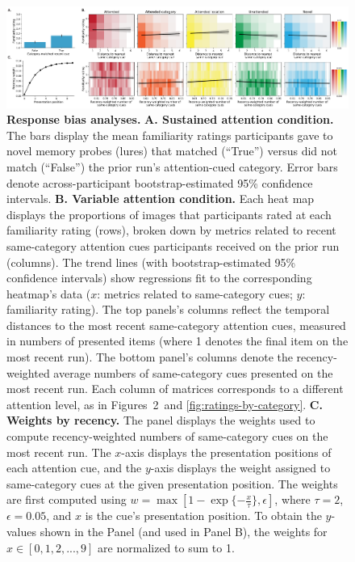 \documentclass{article}
\newcommand{\familiarity}{2}
\begin{document}
\begin{figure}[tp]
  \centering
  \includegraphics[width=1\textwidth]{figs/response_bias.pdf}

\caption{\textbf{Response bias analyses.} \textbf{A. Sustained attention
condition.} The bars display the mean familiarity ratings participants gave to
novel memory probes (lures) that matched (``True'') versus did not match
(``False'') the prior run's attention-cued category. Error bars denote
across-participant bootstrap-estimated 95\% confidence intervals. \textbf{B.
Variable attention condition.} Each heat map displays the proportions of images
that participants rated at each familiarity rating (rows), broken down by
metrics related to recent same-category attention cues participants received on
the prior run (columns). The trend lines (with bootstrap-estimated 95\%
confidence intervals) show regressions fit to the corresponding heatmap's data
($x$: metrics related to same-category cues; $y$: familiarity rating). The top
panels's columns reflect the temporal distances to the most recent
same-category attention cues, measured in numbers of presented items (where 1
denotes the final item on the most recent run). The bottom panel's columns
denote the recency-weighted average numbers of same-category cues presented on
the most recent run. Each column of matrices corresponds to a different
attention level, as in Figures~\familiarity~and \ref{fig:ratings-by-category}.
\textbf{C. Weights by recency.} The panel displays the weights used to compute
recency-weighted numbers of same-category cues on the most recent run. The
$x$-axis displays the presentation positions of each attention cue, and the
$y$-axis displays the weight assigned to same-category cues at the given
presentation position. The weights are first computed using $w = \max\left[1 -
\exp\{-\frac{x}{\tau}\} , \epsilon \right]$, where $\tau = 2$, $\epsilon =
0.05$, and $x$ is the cue's presentation position. To obtain the $y$-values
shown in the Panel (and used in Panel B), the weights for $x \in \left[0, 1, 2,
..., 9\right]$ are normalized to sum to 1.}

\label{fig:response-bias}
\end{figure}
\end{document}
